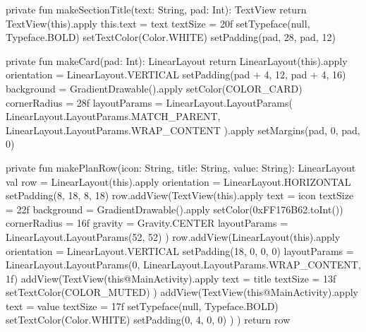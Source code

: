 {    private fun makeSectionTitle(text: String, pad: Int): TextView {
        return TextView(this).apply {
            this.text = text
            textSize = 20f
            setTypeface(null, Typeface.BOLD)
            setTextColor(Color.WHITE)
            setPadding(pad, 28, pad, 12)
        }
    }

    private fun makeCard(pad: Int): LinearLayout {
        return LinearLayout(this).apply {
            orientation = LinearLayout.VERTICAL
            setPadding(pad + 4, 12, pad + 4, 16)
            background = GradientDrawable().apply {
                setColor(COLOR_CARD)
                cornerRadius = 28f
            }
            layoutParams = LinearLayout.LayoutParams(
                LinearLayout.LayoutParams.MATCH_PARENT,
                LinearLayout.LayoutParams.WRAP_CONTENT
            ).apply { setMargins(pad, 0, pad, 0) }
        }
    }

    private fun makePlanRow(icon: String, title: String, value: String): LinearLayout {
        val row = LinearLayout(this).apply {
            orientation = LinearLayout.HORIZONTAL
            setPadding(8, 18, 8, 18)
        }
        row.addView(TextView(this).apply {
            text = icon
            textSize = 22f
            background = GradientDrawable().apply {
                setColor(0xFF176B62.toInt())
                cornerRadius = 16f
            }
            gravity = Gravity.CENTER
            layoutParams = LinearLayout.LayoutParams(52, 52)
        })
        row.addView(LinearLayout(this).apply {
            orientation = LinearLayout.VERTICAL
            setPadding(18, 0, 0, 0)
            layoutParams = LinearLayout.LayoutParams(0, LinearLayout.LayoutParams.WRAP_CONTENT, 1f)
            addView(TextView(this@MainActivity).apply {
                text = title
                textSize = 13f
                setTextColor(COLOR_MUTED)
            })
            addView(TextView(this@MainActivity).apply {
                text = value
                textSize = 17f
                setTypeface(null, Typeface.BOLD)
                setTextColor(Color.WHITE)
                setPadding(0, 4, 0, 0)
            })
        })
        return row
    }

}
